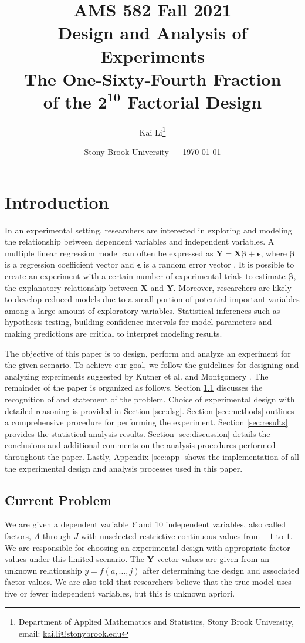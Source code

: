 \documentclass[11pt]{article}
\title{AMS 582 Fall 2021\\Design and Analysis of Experiments\\The One-Sixty-Fourth Fraction\\ of the $\pmb{2^{10}}$ Factorial Design}
\author{
  Kai Li\thanks{Department of Applied Mathematics and Statistics, Stony Brook University, email: \href{mailto:kai.li@stonybrook.edu}{kai.li@stonybrook.edu}}
}
\date{Stony Brook University --- \today}
\begin{document}
\maketitle

\section{Introduction}\label{sec:intro}
In an experimental setting, researchers are interested in exploring and modeling the relationship between dependent variables and independent variables. A multiple linear regression model can often be expressed as $\pmb{Y}=\pmb{X}\pmb{\beta}+\pmb{\epsilon}$, where $\pmb{\beta}$ is a regression coefficient vector and $\pmb{\epsilon}$ is a random error vector \cite{bk:dae2, bk:ilra}. It is possible to create an experiment with a certain number of experimental trials to estimate $\pmb{\beta}$, the explanatory relationship between $\pmb{X}$ and $\pmb{Y}$. Moreover, researchers are likely to develop reduced models due to a small portion of potential important variables among a large amount of exploratory variables. Statistical inferences such as hypothesis testing, building confidence intervals for model parameters and making predictions are critical to interpret modeling results.

The objective of this paper is to design, perform and analyze an experiment for the given scenario. To achieve our goal, we follow the guidelines for designing and analyzing experiments suggested by Kutner et al. and Montgomery \cite{bk:dae1, bk:dae2}. The remainder of the paper is organized as follows. Section \ref{sec:prob} discusses the recognition of and statement of the problem. Choice of experimental design with detailed reasoning is provided in Section \ref{sec:dsg}. Section \ref{sec:methods} outlines a comprehensive procedure for performing the experiment. Section \ref{sec:results} provides the statistical analysis results. Section \ref{sec:discussion} details the conclusions and additional comments on the analysis procedures performed throughout the paper. Lastly, Appendix \ref{sec:app} shows the implementation of all the experimental design and analysis processes used in this paper.

\subsection{Current Problem}\label{sec:prob}
We are given a dependent variable $Y$ and 10 independent variables, also called factors, $A$ through $J$ with unselected restrictive continuous values from $-1$ to $1$. We are responsible for choosing an experimental design with appropriate factor values under this limited scenario. The $\pmb{Y}$ vector values are given from an unknown relationship $y=f(a,\dots,j)$ after determining the design and associated factor values. We are also told that researchers believe that the true model uses five or fewer independent variables, but this is unknown apriori. 
\end{document}
